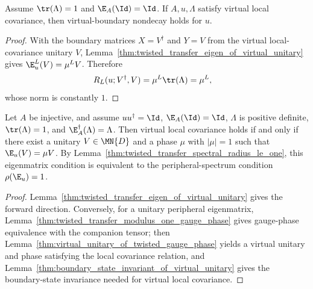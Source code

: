 \begin{lemma}%
    \label{lem:has_string_order_of_local_symmetry}
    \leanok
    Assume $\tr(\Lambda)=1$ and $\E_A(\Id)=\Id$.
    If $A,u,\Lambda$ satisfy virtual local covariance, then virtual-boundary
    nondecay holds for $u$.
\end{lemma}

\begin{proof}
    \leanok
    With the boundary matrices $X = V^\dagger$ and $Y = V$ from the
    virtual local-covariance unitary $V$,
    Lemma~\ref{thm:twisted_transfer_eigen_of_virtual_unitary} gives
    $\E_u^L(V)=\mu^L V$.
    Therefore
    \begin{align}
        R_L(u;V^\dagger,V)
         & = \mu^L \tr(\Lambda)
        = \mu^L,
        \notag
    \end{align}
    whose norm is constantly $1$.
\end{proof}

\begin{lemma}%
    \label{thm:local_symmetry_iff_spectral_radius}
    \leanok
    Let $A$ be injective, and assume $u u^\dagger = \Id$, $\E_A(\Id)=\Id$,
    $\Lambda$ is positive definite, $\tr(\Lambda)=1$, and
    $\E_A^\dagger(\Lambda)=\Lambda$.
    Then virtual local covariance holds if and only if there exist a unitary
    $V \in \MN{D}$ and a phase $\mu$ with $|\mu|=1$ such that
    $\E_u(V) = \mu V$.
    By Lemma~\ref{thm:twisted_transfer_spectral_radius_le_one}, this
    eigenmatrix condition is equivalent to the peripheral-spectrum condition $\rho(\E_u)=1$.
\end{lemma}

\begin{proof}
    \leanok
    Lemma~\ref{thm:twisted_transfer_eigen_of_virtual_unitary} gives the
    forward direction.
    Conversely, for a unitary peripheral eigenmatrix,
    Lemma~\ref{thm:twisted_transfer_modulus_one_gauge_phase} gives
    gauge-phase equivalence with the companion tensor; then
    Lemma~\ref{thm:virtual_unitary_of_twisted_gauge_phase} yields a virtual
    unitary and phase satisfying the local covariance relation, and
    Lemma~\ref{thm:boundary_state_invariant_of_virtual_unitary} gives the
    boundary-state invariance needed for virtual local covariance.
\end{proof}

